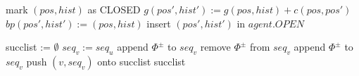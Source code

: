 \documentclass[letterpaper]{article}
\begin{document}
\begin{algorithm}
\caption{$expand(pos, hist)$}
\label{alg:update}
\begin{algorithmic}
\STATE mark $(pos, hist)$ as CLOSED
\STATE $g(pos', hist') := g(pos, hist) + c(pos, pos')$
\STATE $bp(pos', hist') := (pos, hist)$
\STATE insert $(pos', hist')$ in $agent.OPEN$
\ENDIF
\ENDIF
\ENDFOR
\end{algorithmic}
\end{algorithm}

\begin{comment}

\begin{algorithm}
\caption{$MultiAgent A^*HighLevel()$}
\label{alg:update}
\begin{algorithmic}
\STATE $\forall i:\; s_i := start_i$
\WHILE {$g(goal_1, \ldots, goal_N) > f(s_1,\ldots,s_N)$}
\STATE $\forall i:\; expand(s_i)$
\STATE $(s_1,\ldots,s_N) = \arg\min_{s_1,\ldots,s_N} f(s_1,\ldots,s_N)$
\ENDWHILE
\end{algorithmic}
\end{algorithm}

\begin{algorithm}
\caption{$f(s)$}
\label{alg:update}
\begin{algorithmic}
\STATE $f := \infty$
\FORALL {tuples $s_{1\ldots N}\in OPEN$ that include $s$}
\STATE $f := \min(f, jointPriority(s_{1\ldots N}))$
\ENDFOR
\RETURN $f$
\end{algorithmic}
\end{algorithm}

\end{comment}

\begin{algorithm}
\caption{$successors(u, seq_u)$}
\label{alg:update}
\begin{algorithmic}
\STATE succlist := $\emptyset$
\STATE $seq_v := seq_u$
\STATE append $\Phi^\pm$ to $seq_v$
\ENDFOR
{}
\STATE remove $\Phi^\pm$ from $seq_v$
\STATE append $\Phi^\pm$ to $seq_v$
\ENDFOR
\STATE push $(v,seq_v)$ onto succlist
\ENDFOR
\RETURN succlist
\end{algorithmic}
\end{algorithm}
\end{document}
